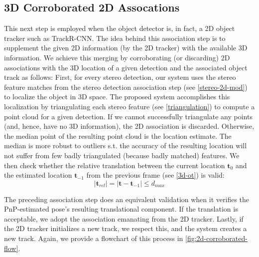 \documentclass[headsepline, hidelinks, footsepline, footinclude=false, oneside, fontsize=11pt, paper=a4, listof=totoc, bibliography=totoc]{scrbook}
\begin{document}
\subsection{3D Corroborated 2D Assocations}
\label{sec:org376927d}
    This next step is employed when the object detector is, in fact, a 2D object tracker such as TrackR-CNN. 
The idea behind this association step is to supplement the given 2D information (by the 2D tracker) with the available 3D information. 
We achieve this merging by corroborating (or discarding) 2D associations with the 3D location of a given detection and the associated object track as follows:
First, for every stereo detection, our system uses the stereo feature matches from the stereo detection association step (see \cref{stereo-2d-mod}) to localize the object in 3D space.
The proposed system accomplishes this localization by triangulating each stereo feature (see \cref{triangulation}) to compute a point cloud for a given detection. 
If we cannot successfully triangulate any points (and, hence, have no 3D information), the 2D association is discarded. 
Otherwise, the median point of the resulting point cloud is the location estimate. 
The median is more robust to outliers s.t. the accuracy of the resulting location will not suffer from few badly triangulated (because badly matched) features.
We then check whether the relative translation between the current location \(\mathbf{t}_0\) and the estimated location \(\mathbf{t}_{-1}\) from the previous frame (see \cref{3d-ot}) is valid:
\begin{equation}
|\mathbf{t}_{rel}| = |\mathbf{t} - \mathbf{t}_{-1}| \leq d_{max}
\end{equation}

The preceding association step does an equivalent validation when it verifies the PnP-estimated pose's resulting translational component. 
If the translation is acceptable, we adopt the association emanating from the 2D tracker.
Lastly, if the 2D tracker initializes a new track, we respect this, and the system creates a new track. 
Again, we provide a flowchart of this process in \cref{fig:2d-corroborated-flow}. 
\end{document}
